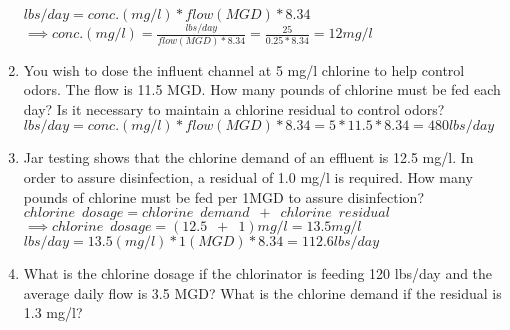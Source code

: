 \begin{enumerate}
$lbs/day=conc. (mg/l)*flow(MGD)*8.34$\\
$\implies conc. (mg/l)=\frac{lbs/day}{flow(MGD)*8.34}=\frac{25}{0.25*8.34}=\boxed{12mg/l}$
\vspace{0.25cm}
\item You wish to dose the influent channel at 5 mg/l chlorine to help control odors. The flow is 11.5 MGD. How many pounds of chlorine must be fed each day? Is it necessary to maintain a chlorine residual to control odors?\\
\vspace{0.25cm}
$lbs/day=conc. (mg/l)*flow(MGD)*8.34=5*11.5*8.34=\boxed{480lbs/day}$\\
\vspace{0.25cm}
\item Jar testing shows that the chlorine demand of an effluent is 12.5 mg/l. In order to assure disinfection, a residual of 1.0 mg/l is required. How many pounds of chlorine must be fed per 1MGD to assure disinfection?\\
\vspace{0.25cm} 
$ chlorine \enspace dosage = chlorine \enspace demand \enspace + \enspace chlorine \enspace residual$\\
\vspace{0.25cm}
$\implies chlorine \enspace dosage = (12.5 \enspace + \enspace 1 )mg/l=13.5 mg/l$\\
\vspace{0.25cm}
$lbs/day=13.5(mg/l)*1(MGD)*8.34=\boxed{112.6 lbs/day}$\\
\vspace{0.25cm}
\item What is the chlorine dosage if the chlorinator is feeding 120 lbs/day and the average daily flow is 3.5 MGD?  What is the chlorine demand if the residual is 1.3 mg/l?\\
\vspace{0.25cm}


\end{enumerate}
